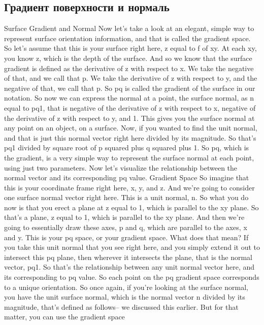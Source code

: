\documentclass[12pt]{article}
\begin{document}
\subsection{Градиент поверхности и нормаль}

Surface Gradient and Normal
Now let's take a look at an elegant, simple way
to represent surface orientation information,
and that is called the gradient space.
So let's assume that this is your surface right here,
z equal to f of xy.
At each xy, you know z, which is the depth of the surface.
And so we know that the surface gradient
is defined as the derivative of z with respect to x.
We take the negative of that, and we call that p.
We take the derivative of z with respect to y,
and the negative of that, we call that p.
So pq is called the gradient of the surface in our notation.
So now we can express the normal at a point, the surface
normal, as n equal to pq1, that is
negative of the derivative of z with respect
to x, negative of the derivative of z with respect to y, and 1.
This gives you the surface normal at any point
on an object, on a surface.
Now, if you wanted to find the unit normal, and that is just
this normal vector right here divided by its magnitude.
So that's pq1 divided by square root of p squared
plus q squared plus 1.
So pq, which is the gradient, is a very simple way
to represent the surface normal at each point, using just two
parameters.
Now let's visualize the relationship
between the normal vector and its corresponding pq value.
Gradient Space
So imagine that this is your coordinate frame right
here, x, y, and z.
And we're going to consider one surface normal vector right
here.
This is a unit normal, n.
So what you do now is that you erect a plane at z
equal to 1, which is parallel to the xy plane.
So that's a plane, z equal to 1, which
is parallel to the xy plane.
And then we're going to essentially draw
these axes, p and q, which are parallel to the axes, x and y.
This is your pq space, or your gradient space.
What does that mean?
If you take this unit normal that you see right here,
and you simply extend it out to intersect this pq plane,
then wherever it intersects the plane,
that is the normal vector, pq1.
So that's the relationship between any unit normal vector
here, and its corresponding to pq value.
So each point on the pq gradient space
corresponds to a unique orientation.
So once again, if you're looking at the surface normal,
you have the unit surface normal,
which is the normal vector n divided by its magnitude,
that's defined as follows--
we discussed this earlier.
But for that matter, you can use the gradient space
\end{document}
